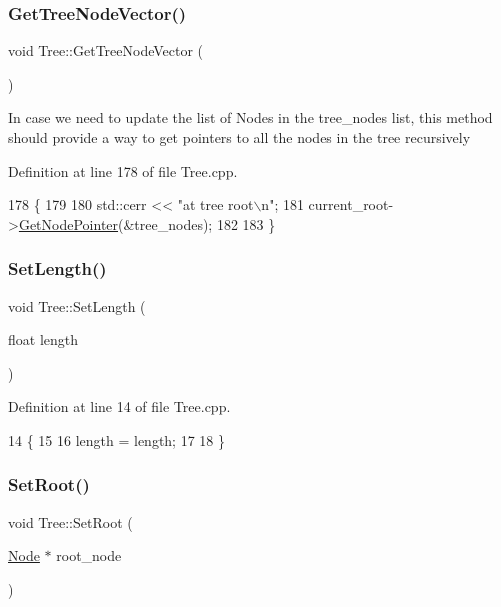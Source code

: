 \subsubsection{\texorpdfstring{Get\+Tree\+Node\+Vector()}{GetTreeNodeVector()}}
{\footnotesize\ttfamily void Tree\+::\+Get\+Tree\+Node\+Vector (\begin{DoxyParamCaption}{ }\end{DoxyParamCaption})}

In case we need to update the list of Nodes in the tree\+\_\+nodes list, this method should provide a way to get pointers to all the nodes in the tree recursively 

Definition at line 178 of file Tree.\+cpp.


\begin{DoxyCode}
178                             \{
179    
180   std::cerr << \textcolor{stringliteral}{"at tree root\(\backslash\)n"};
181   current\_root->\hyperlink{classNode_a8e58dc16fc38e2076c7ddbe5b9f04177}{GetNodePointer}(&tree\_nodes);
182   
183 \}
\end{DoxyCode}
\mbox{\label{classTree_aa16a8485326ce51d6d7324f23066eb27}} 
\subsubsection{\texorpdfstring{Set\+Length()}{SetLength()}}
{\footnotesize\ttfamily void Tree\+::\+Set\+Length (\begin{DoxyParamCaption}\item[{float}]{length }\end{DoxyParamCaption})}



Definition at line 14 of file Tree.\+cpp.


\begin{DoxyCode}
14                                 \{
15 
16     length = length;
17   
18 \}
\end{DoxyCode}
\mbox{\label{classTree_ae592faa2c1f2da3cc1157bd9a4b884b5}} 
\subsubsection{\texorpdfstring{Set\+Root()}{SetRoot()}}
{\footnotesize\ttfamily void Tree\+::\+Set\+Root (\begin{DoxyParamCaption}\item[{\hyperlink{classNode}{Node} $\ast$}]{root\+\_\+node }\end{DoxyParamCaption})}



